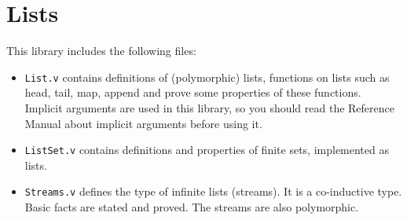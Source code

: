 \section{Lists}\label{Lists}

This library includes the following files:

\begin{itemize}

\item {\tt List.v} contains definitions of (polymorphic) lists, 
  functions on lists such as head, tail, map, append and prove some
  properties of these functions. Implicit arguments are used in this
  library, so you should read the Reference Manual about implicit
  arguments before using it.

\item {\tt ListSet.v} contains definitions and properties of finite
  sets, implemented as lists.

\item {\tt Streams.v} defines the type of infinite lists (streams). It is a
  co-inductive type. Basic facts are stated and proved. The streams are
  also polymorphic.

\end{itemize}
